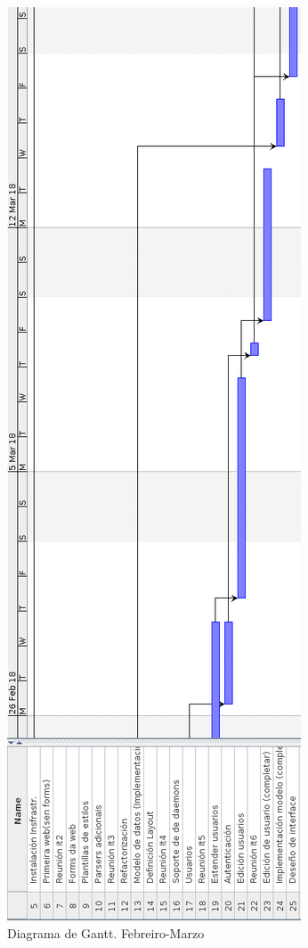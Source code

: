 \begin{figure}[H]
	\centering
	\includegraphics[scale=0.45,keepaspectratio=true]{./images/gantt/g6.png}
	\caption{Diagrama de Gantt. Febreiro-Marzo}
\end{figure}

